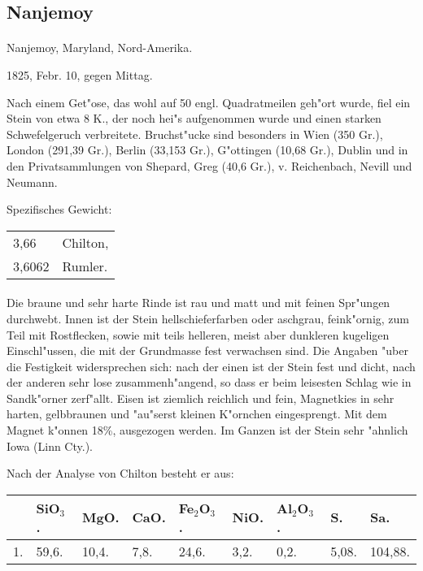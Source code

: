 \documentclass[a4paper, 11pt, oneside]{article}
\begin{document}
\subsection{Nanjemoy}
\normalsize
\paragraph{}
Nanjemoy, Maryland, Nord-Amerika.

1825, Febr. 10, gegen Mittag.

Nach einem Get"ose, das wohl auf 50 engl. Quadratmeilen geh"ort wurde, fiel ein Stein von etwa 8 K., der noch hei"s aufgenommen wurde und einen starken Schwefelgeruch verbreitete. Bruchst"ucke sind besonders in Wien (350 Gr.), London (291,39 Gr.), Berlin (33,153 Gr.), G"ottingen (10,68 Gr.), Dublin und in den Privatsammlungen von Shepard, Greg (40,6 Gr.), v. Reichenbach, Nevill und Neumann.

Spezifisches Gewicht:
\begin{table}[!ht]
    \centering
    \begin{tabular}{l l}
        3,66 & Chilton,\\
        3,6062 & Rumler.
    \end{tabular}
\end{table}
\paragraph{}
Die braune und sehr harte Rinde ist rau und matt und mit feinen Spr"ungen durchwebt. Innen ist der Stein hellschieferfarben oder aschgrau, feink"ornig, zum Teil mit Rostflecken, sowie mit teils helleren, meist aber dunkleren kugeligen Einschl"ussen, die mit der Grundmasse fest verwachsen sind. Die Angaben "uber die Festigkeit widersprechen sich: nach der einen ist der Stein fest und dicht, nach der anderen sehr lose zusammenh"angend, so dass er beim leisesten Schlag wie in Sandk"orner zerf"allt. Eisen ist ziemlich reichlich und fein, Magnetkies in sehr harten, gelbbraunen und "au"serst kleinen K"ornchen eingesprengt. Mit dem Magnet k"onnen 18\%, ausgezogen werden. Im Ganzen ist der Stein sehr "ahnlich Iowa (Linn Cty.).

Nach der Analyse von Chilton besteht er aus:
\begin{table}[!ht]
    \centering
    \begin{tabular}{l l l l l l l l l}
         & SiO$_{3}$. & MgO. & CaO. & Fe$_{2}$O$_{3}$. & NiO. & Al$_{2}$O$_{3}$. & S. & Sa. \\ \hline
        1. & 59,6. & 10,4. & 7,8. & 24,6. & 3,2. & 0,2. & 5,08. & 104,88. \\
    \end{tabular}
\end{table}
\end{document}
